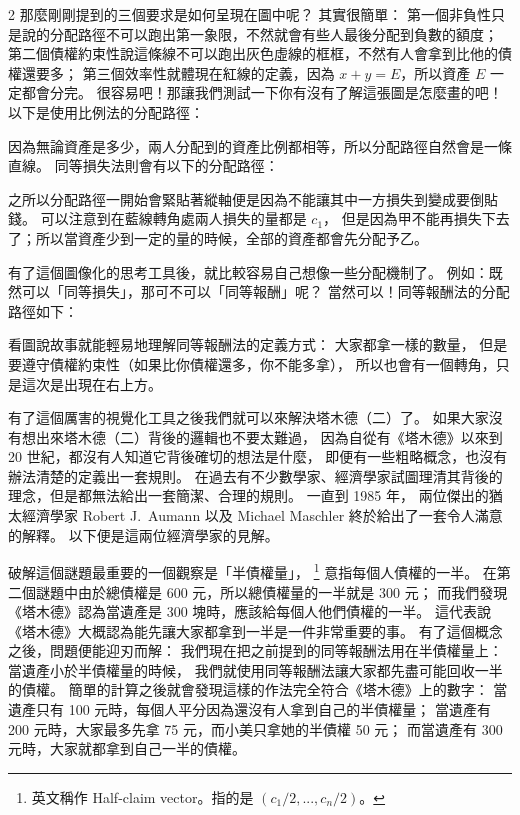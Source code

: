 \documentclass[10pt]{article}
\begin{document}
\begin{multicols*}{2}
那麼剛剛提到的三個要求是如何呈現在圖中呢？
其實很簡單：
第一個\textsf{非負性}只是說的分配路徑不可以跑出第一象限，不然就會有些人最後分配到負數的額度；
第二個\textsf{債權約束性}說這條線不可以跑出灰色虛線的框框，不然有人會拿到比他的債權還要多；
第三個\textsf{效率性}就體現在紅線的定義，因為 $x + y = E$，所以資產 $E$ 一定都會分完。
很容易吧！那讓我們測試一下你有沒有了解這張圖是怎麼畫的吧！以下是使用\textsf{比例法}的分配路徑：

因為無論資產是多少，兩人分配到的資產比例都相等，所以分配路徑自然會是一條直線。
\textsf{同等損失法}則會有以下的分配路徑：

之所以分配路徑一開始會緊貼著縱軸便是因為不能讓其中一方損失到變成要倒貼錢。
可以注意到在藍線轉角處兩人損失的量都是 $c_1$，
但是因為甲不能再損失下去了；所以當資產少到一定的量的時候，全部的資產都會先分配予乙。

有了這個圖像化的思考工具後，就比較容易自己想像一些分配機制了。
例如：既然可以「同等損失」，那可不可以「同等報酬」呢？
當然可以！\textsf{同等報酬法}的分配路徑如下：

看圖說故事就能輕易地理解\textsf{同等報酬法}的定義方式：
大家都拿一樣的數量，
但是要遵守\textsf{債權約束性}（如果比你債權還多，你不能多拿），
所以也會有一個轉角，只是這次是出現在右上方。

有了這個厲害的視覺化工具之後我們就可以來解決\textsf{塔木德（二）}了。
如果大家沒有想出來\textsf{塔木德（二）}背後的邏輯也不要太難過，
因為自從有《塔木德》以來到 20 世紀，都沒有人知道它背後確切的想法是什麼，
即便有一些粗略概念，也沒有辦法清楚的定義出一套規則。
在過去有不少數學家、經濟學家試圖理清其背後的理念，但是都無法給出一套簡潔、合理的規則。
一直到 1985 年，
兩位傑出的猶太經濟學家 Robert J.\ Aumann 以及 Michael Maschler 終於給出了一套令人滿意的解釋。
以下便是這兩位經濟學家的見解。

破解這個謎題最重要的一個觀察是「半債權量」，
\footnote{英文稱作 Half-claim vector。指的是 $(c_1/2,...,c_n/2)$。}
意指每個人債權的一半。
在第二個謎題中由於總債權是 600 元，所以總債權量的一半就是 300 元；
而我們發現《塔木德》認為當遺產是 300 塊時，應該給每個人他們債權的一半。
這代表說《塔木德》大概認為能先讓大家都拿到一半是一件非常重要的事。
有了這個概念之後，問題便能迎刃而解：
我們現在把之前提到的\textsf{同等報酬法}用在半債權量上：
當遺產小於半債權量的時候，
我們就使用\textsf{同等報酬法}讓大家都先盡可能回收一半的債權。
簡單的計算之後就會發現這樣的作法完全符合《塔木德》上的數字：
當遺產只有 100 元時，每個人平分因為還沒有人拿到自己的半債權量；
當遺產有 200 元時，大家最多先拿 75 元，而小美只拿她的半債權 50 元；
而當遺產有 300 元時，大家就都拿到自己一半的債權。


\end{multicols*}
\end{document}
